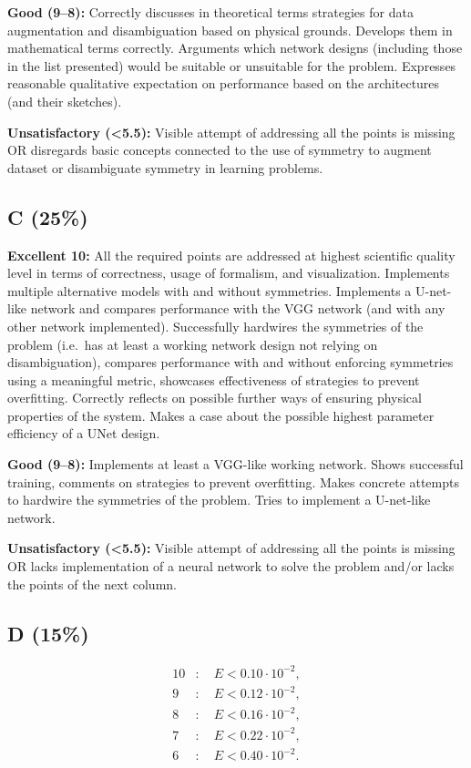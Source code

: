 \documentclass[11pt,a4paper]{article}
\begin{document}
\textbf{Good (9--8):} Correctly discusses in theoretical terms strategies for data augmentation and disambiguation based on physical grounds. Develops them in mathematical terms correctly. Arguments which network designs (including those in the list presented) would be suitable or unsuitable for the problem. Expresses reasonable qualitative expectation on performance based on the architectures (and their sketches).

\textbf{Unsatisfactory (<5.5):} Visible attempt of addressing all the points is missing OR disregards basic concepts connected to the use of symmetry to augment dataset or disambiguate symmetry in learning problems.

\subsection*{C (25\%)}
\textbf{Excellent 10:} All the required points are addressed at highest scientific quality level in terms of correctness, usage of formalism, and visualization. Implements multiple alternative models with and without symmetries. Implements a U-net-like network and compares performance with the VGG network (and with any other network implemented). Successfully hardwires the symmetries of the problem (i.e.\ has at least a working network design not relying on disambiguation), compares performance with and without enforcing symmetries using a meaningful metric, showcases effectiveness of strategies to prevent overfitting. Correctly reflects on possible further ways of ensuring physical properties of the system. Makes a case about the possible highest parameter efficiency of a UNet design.

\textbf{Good (9--8):} Implements at least a VGG-like working network. Shows successful training, comments on strategies to prevent overfitting. Makes concrete attempts to hardwire the symmetries of the problem. Tries to implement a U-net-like network.

\textbf{Unsatisfactory (<5.5):} Visible attempt of addressing all the points is missing OR lacks implementation of a neural network to solve the problem and/or lacks the points of the next column.

\subsection*{D (15\%)}
\[
\begin{aligned}
10 &: \quad E < 0.10 \cdot 10^{-2},\\
9 &: \quad E < 0.12 \cdot 10^{-2},\\
8 &: \quad E < 0.16 \cdot 10^{-2},\\
7 &: \quad E < 0.22 \cdot 10^{-2},\\
6 &: \quad E < 0.40 \cdot 10^{-2}.
\end{aligned}
\]
\end{document}
